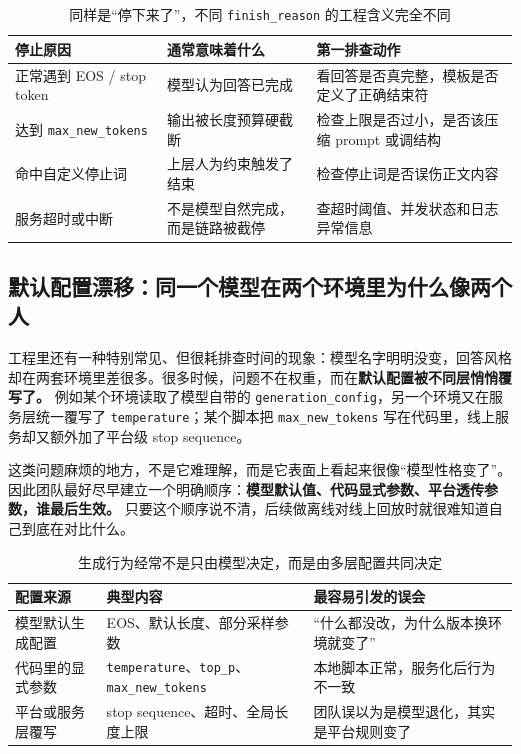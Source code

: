\begin{table}[H]
\centering
\small
\begin{tabularx}{\textwidth}{>{\raggedright\arraybackslash}p{2.8cm}>{\raggedright\arraybackslash}p{3.4cm}>{\raggedright\arraybackslash}X}
\toprule
\textbf{停止原因} & \textbf{通常意味着什么} & \textbf{第一排查动作} \\
\midrule
正常遇到 EOS / stop token & 模型认为回答已完成 & 看回答是否真完整，模板是否定义了正确结束符 \\
达到 \texttt{max\_new\_tokens} & 输出被长度预算硬截断 & 检查上限是否过小，是否该压缩 prompt 或调结构 \\
命中自定义停止词 & 上层人为约束触发了结束 & 检查停止词是否误伤正文内容 \\
服务超时或中断 & 不是模型自然完成，而是链路被截停 & 查超时阈值、并发状态和日志异常信息 \\
\bottomrule
\end{tabularx}
\caption{同样是“停下来了”，不同 \texttt{finish\_reason} 的工程含义完全不同}
\label{tab:finish-reasons}
\end{table}

\subsection{默认配置漂移：同一个模型在两个环境里为什么像两个人}
工程里还有一种特别常见、但很耗排查时间的现象：模型名字明明没变，回答风格却在两套环境里差很多。很多时候，问题不在权重，而在\textbf{默认配置被不同层悄悄覆写了。} 例如某个环境读取了模型自带的 \texttt{generation\_config}，另一个环境又在服务层统一覆写了 \texttt{temperature}；某个脚本把 \texttt{max\_new\_tokens} 写在代码里，线上服务却又额外加了平台级 stop sequence。

这类问题麻烦的地方，不是它难理解，而是它表面上看起来很像“模型性格变了”。因此团队最好尽早建立一个明确顺序：\textbf{模型默认值、代码显式参数、平台透传参数，谁最后生效。} 只要这个顺序说不清，后续做离线对线上回放时就很难知道自己到底在对比什么。

\begin{table}[H]
\centering
\small
\begin{tabularx}{\textwidth}{>{\raggedright\arraybackslash}p{3cm}>{\raggedright\arraybackslash}p{3cm}>{\raggedright\arraybackslash}X}
\toprule
\textbf{配置来源} & \textbf{典型内容} & \textbf{最容易引发的误会} \\
\midrule
模型默认生成配置 & EOS、默认长度、部分采样参数 & “什么都没改，为什么版本换环境就变了” \\
代码里的显式参数 & \texttt{temperature}、\texttt{top\_p}、\texttt{max\_new\_tokens} & 本地脚本正常，服务化后行为不一致 \\
平台或服务层覆写 & stop sequence、超时、全局长度上限 & 团队误以为是模型退化，其实是平台规则变了 \\
\bottomrule
\end{tabularx}
\caption{生成行为经常不是只由模型决定，而是由多层配置共同决定}
\label{tab:generation-config-sources}
\end{table}

